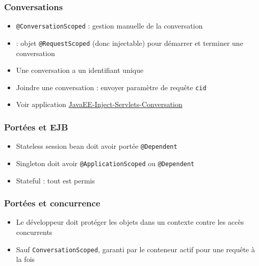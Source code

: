 \documentclass[english, french]{beamer}
\begin{document}
\begin{frame}
	\frametitle{Conversations}
	\begin{itemize}
		\item \texttt{@ConversationScoped} : gestion manuelle de la conversation
		\item {} : objet \texttt{@RequestScoped} (donc injectable) pour démarrer et terminer une conversation
		\item Une conversation a un identifiant unique
		\item Joindre une conversation : envoyer paramètre de requête \texttt{cid}
		\item Voir application \href{https://github.com/oliviercailloux/samples/tree/master/JavaEE-Inject-Servlets-Conversation}{JavaEE-Inject-Servlets-Conversation}
	\end{itemize}
\end{frame}

\begin{frame}
	\frametitle{Portées et EJB}
	\begin{itemize}
		\item Stateless session bean doit avoir portée \texttt{@Dependent}
		\item Singleton doit avoir \texttt{@ApplicationScoped} {\tiny ou \texttt{@Dependent}}
		\item Stateful : tout est permis
	\end{itemize}
\end{frame}

\begin{frame}
	\frametitle{Portées et concurrence}
	\begin{itemize}
		\item Le développeur doit protéger les objets dans un contexte contre les accès concurrents
		\item Sauf \texttt{ConversationScoped}, garanti par le conteneur actif pour une requête à la fois
	\end{itemize}
\end{frame}
\end{document}
